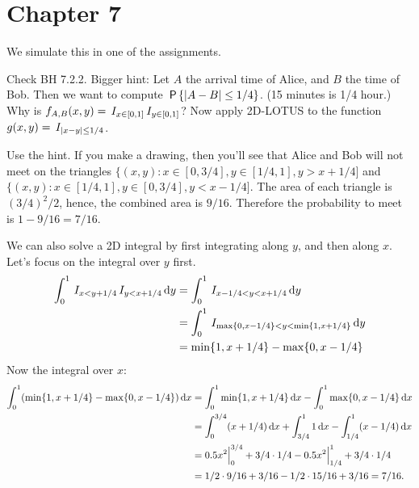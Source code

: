 




\chapter{Chapter 7}
\label{cha:questions-chapter-7}




\setcounter{theorem}{0}
\begin{exercise}[BH.7.1]
We simulate this in one of the assignments.
\begin{hint}
Check BH 7.2.2. Bigger hint: Let $A$ the arrival time of Alice, and $B$ the time of Bob. Then we want to compute $\P{|A-B|\leq 1/4}$.  (15 minutes is 1/4 hour.)  Why is $f_{A,B}(x,y) = \1{x\in[0,1]}\1{y\in [0,1]}$? Now apply 2D-LOTUS to the function $g(x,y) = \1{|x-y|\leq 1/4}$.
\end{hint}
\begin{solution}
Use the hint. If you make a drawing, then you'll see that Alice and Bob will not meet on the triangles
$\{(x,y) : x\in [0, 3/4], y\in [1/4, 1], y>x+1/4]$ and $\{(x,y) : x\in [1/4, 1], y\in [0, 3/4], y<x-1/4]$. The area of each triangle is $(3/4)^{2}/2$, hence, the combined area is $9/16$. Therefore the probability to meet is $1-9/16=7/16$.

We can also solve   a 2D integral by first integrating along $y$, and then along $x$. Let's focus on the integral over $y$ first.
\begin{align*}
\int_0^1 \1{x<y+1/4}\1{y<x+1/4} \d y
&=\int_0^1 \1{x-1/4<y<x+1/4} \d y \\
&=\int_0^1 \1{\max\{0, x-1/4\} <y < \min\{1,x+1/4\}} \d y \\
&= \min\{1,x+1/4\} - \max\{0, x-1/4\}
\end{align*}
Now the integral over $x$:
\begin{align*}
  \int_0^1 (\min\{1,x+1/4\} - \max\{0, x-1/4\}) \d x
&=  \int_0^1 \min\{1,x+1/4\}\d x - \int_0^{1}\max\{0, x-1/4\} \d x  \\
&=  \int_0^{3/4}(x+1/4)\d x + \int_{3/4}^{1}1 \d x
 - \int_{1/4}^{1}(x-1/4) \d x \\
  &=0.5 x^2\Big|_{0}^{3/4} + 3/4\cdot 1/4 - 0.5x^2\Big|_{1/4}^1 + 3/4\cdot 1/4 \\
  &= 1/2\cdot 9/16 + 3/16 - 1/2\cdot 15/16 + 3/16 = 7/16.
\end{align*}

\end{solution}
\end{exercise}


